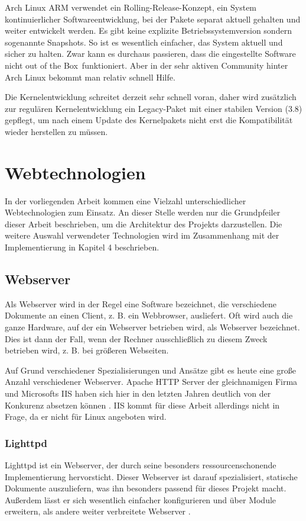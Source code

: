 Arch Linux ARM verwendet ein Rolling-Release-Konzept, ein System kontinuierlicher Softwareentwicklung, bei der Pakete separat aktuell gehalten und weiter entwickelt werden. Es gibt keine explizite Betriebssystemversion sondern sogenannte Snapshots. So ist es  wesentlich einfacher, das System aktuell und sicher zu halten. Zwar kann es durchaus passieren, dass die eingestellte Software nicht \glqq out of the Box\grqq ~funktioniert. Aber in der sehr aktiven Community hinter Arch Linux bekommt man relativ schnell Hilfe.

Die Kernelentwicklung schreitet derzeit sehr schnell voran, daher wird zusätzlich zur regulären Kernelentwicklung ein Legacy-Paket mit einer stabilen Version (3.8) gepflegt, um nach einem Update des Kernelpakets nicht erst die Kompatibilität wieder herstellen zu müssen.


\section{Webtechnologien}
In der vorliegenden Arbeit kommen eine Vielzahl unterschiedlicher Webtechnologien zum Einsatz. An dieser Stelle werden nur die Grundpfeiler dieser Arbeit beschrieben, um die Architektur des Projekts darzustellen. Die weitere Auswahl verwendeter Technologien wird im Zusammenhang mit der Implementierung in Kapitel 4 beschrieben.

\subsection{Webserver}
Als Webserver wird in der Regel eine Software bezeichnet, die verschiedene Dokumente an einen Client, z. B. ein Webbrowser, ausliefert. Oft wird auch die ganze Hardware, auf der ein Webserver betrieben wird, als Webserver bezeichnet. Dies ist dann der Fall, wenn der Rechner ausschließlich zu diesem Zweck betrieben wird, z. B. bei größeren Webseiten.

Auf Grund verschiedener Spezialisierungen und Ansätze gibt es heute eine große Anzahl verschiedener Webserver. Apache HTTP Server der gleichnamigen Firma und Microsofts IIS haben sich hier in den letzten Jahren deutlich von der Konkurenz absetzen können \cite{webserversurvey1014}. IIS kommt für diese Arbeit allerdings nicht in Frage, da er nicht für Linux angeboten wird.

\subsubsection{Lighttpd}
Lighttpd ist ein Webserver, der durch seine besonders ressourcenschonende Implementierung hervorsticht. Dieser Webserver ist darauf spezialisiert, statische Dokumente auszuliefern, was ihn besonders passend für dieses Projekt macht. Außerdem lässt er sich wesentlich einfacher konfigurieren und über Module erweitern, als andere weiter verbreitete Webserver \cite{krieg2009}.


